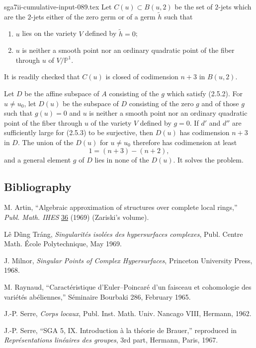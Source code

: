 \begin{filecontents*}{sga7ii-cumulative-input-089.tex}
Let $C(u)\subset B(u,2)$ be the set of $2$-jets which are the
$2$-jets either of the zero germ or of a germ $\widetilde h$ such
that
\begin{enumerate}
\item[(a)] $u$ lies on the variety $V$ defined by $\widetilde h=0$;
\item[(b)] $u$ is neither a smooth point nor an ordinary quadratic
point of the fiber through $u$ of $V/\mathbb P^1$.
\end{enumerate}
It is readily checked that $C(u)$ is closed of codimension $n+3$ in
$B(u,2)$.

Let $D$ be the affine subspace of $A$ consisting of the $g$ which
satisfy (2.5.2).  For $u\ne u_0$, let $D(u)$ be the subspace of $D$
consisting of the zero $g$ and of those $g$ such that $g(u)=0$ and
$u$ is neither a smooth point nor an ordinary quadratic point of the
fiber through $u$ of the variety $V$ defined by $g=0$.  If $d'$ and
$d''$ are sufficiently large for (2.5.3) to be surjective, then
$D(u)$ has codimension $n+3$ in $D$.  The union of the $D(u)$ for
$u\ne u_0$ therefore has codimension at least
\[
1=(n+3)-(n+2),
\]
and a general element $g$ of $D$ lies in none of the $D(u)$.  It
solves the problem.

\subsection*{Bibliography}

\begin{enumerate}[label={[\arabic*]},leftmargin=3em]
\item M. Artin, ``Algebraic approximation of structures over complete
local rings,'' \emph{Publ. Math. IHES} \underline{36} (1969)
(Zariski's volume).
\item L\^e D\~ung Tr\'ang, \emph{Singularit\'es isol\'ees des
hypersurfaces complexes}, Publ. Centre Math. \'Ecole Polytechnique,
May 1969.
\item J. Milnor, \emph{Singular Points of Complex Hypersurfaces},
Princeton University Press, 1968.
\item M. Raynaud, ``Caract\'eristique d'Euler--Poincar\'e d'un
faisceau et cohomologie des vari\'et\'es ab\'eliennes,'' S\'eminaire
Bourbaki 286, February 1965.
\item J.-P. Serre, \emph{Corps locaux}, Publ. Inst. Math. Univ.
Nancago VIII, Hermann, 1962.
\item J.-P. Serre, ``SGA 5, IX. Introduction \`a la th\'eorie de
Brauer,'' reproduced in \emph{Repr\'esentations lin\'eaires des
groupes}, 3rd part, Hermann, Paris, 1967.
\end{enumerate}
\end{filecontents*}
